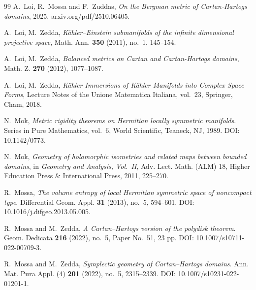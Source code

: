 \documentclass[reqno, 11pt]{amsart}
\begin{document}
\begin{thebibliography}{99}
\label{LOIMOSSAZUDDAS2025bergman}
A.~Loi, R.~Mossa and F.~Zuddas, \textit{On the Bergman metric of Cartan-Hartogs domains},  2025.
arxiv.org/pdf/2510.06405.


A.~Loi, M.~Zedda,
\emph{K\"ahler--Einstein submanifolds of the infinite dimensional projective space},
Math. Ann. \textbf{350} (2011), no.~1, 145--154.


A.~Loi, M.~Zedda,
\newblock \emph{Balanced metrics on Cartan and Cartan-Hartogs domains},
\newblock Math. Z. \textbf{270} (2012), 1077--1087.


A.~Loi, M.~Zedda,
\emph{K\"ahler Immersions of K\"ahler Manifolds into Complex Space Forms},
Lecture Notes of the Unione Matematica Italiana, vol.~23, Springer, Cham, 2018.



\label{MOK1989MetricRigidityThmLocHSS}
N.~Mok, \textit{Metric rigidity theorems on Hermitian locally symmetric manifolds}. Series in Pure Mathematics, vol.~6, World Scientific, Teaneck, NJ, 1989. DOI: 10.1142/0773.



N.~Mok,
\newblock \emph{Geometry of holomorphic isometries and related maps between bounded domains},
\newblock in \emph{Geometry and Analysis, Vol.~II}, Adv. Lect. Math. (ALM) 18, Higher Education Press \& International Press, 2011, 225--270.




\label{MOSSA2013VolumeEntr}
R.~Mossa, \textit{The volume entropy of local Hermitian symmetric space of noncompact type}. Differential Geom. Appl. \textbf{31} (2013), no.~5, 594--601. DOI: 10.1016/j.difgeo.2013.05.005.

\label{MOSSAZEDDA2022polch}
R.~Mossa and M.~Zedda, \textit{A Cartan--Hartogs version of the polydisk theorem}. Geom. Dedicata \textbf{216} (2022), no.~5, Paper No.~51, 23 pp. DOI: 10.1007/s10711-022-00709-3.

\label{MOSSAZEDDAS2022symplch}
R.~Mossa and M.~Zedda, \textit{Symplectic geometry of Cartan--Hartogs domains}. Ann. Mat. Pura Appl. (4) \textbf{201} (2022), no.~5, 2315--2339. DOI: 10.1007/s10231-022-01201-1.


\end{thebibliography}
\end{document}
